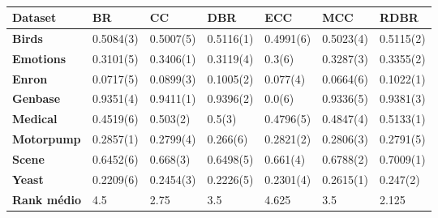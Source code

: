 \begin{table}[h]
\begin{tabular}{lllllll}
\hline
\textbf{Dataset}    & \textbf{BR} & \textbf{CC} & \textbf{DBR} & \textbf{ECC} & \textbf{MCC} & \textbf{RDBR} \\ \hline
\textbf{Birds}      & 0.5084(3)   & 0.5007(5)   & 0.5116(1)    & 0.4991(6)    & 0.5023(4)    & 0.5115(2)     \\
\textbf{Emotions}   & 0.3101(5)   & 0.3406(1)   & 0.3119(4)    & 0.3(6)       & 0.3287(3)    & 0.3355(2)     \\
\textbf{Enron}      & 0.0717(5)   & 0.0899(3)   & 0.1005(2)    & 0.077(4)     & 0.0664(6)    & 0.1022(1)     \\
\textbf{Genbase}    & 0.9351(4)   & 0.9411(1)   & 0.9396(2)    & 0.0(6)       & 0.9336(5)    & 0.9381(3)     \\
\textbf{Medical}    & 0.4519(6)   & 0.503(2)    & 0.5(3)       & 0.4796(5)    & 0.4847(4)    & 0.5133(1)     \\
\textbf{Motorpump}  & 0.2857(1)   & 0.2799(4)   & 0.266(6)     & 0.2821(2)    & 0.2806(3)    & 0.2791(5)     \\
\textbf{Scene}      & 0.6452(6)   & 0.668(3)    & 0.6498(5)    & 0.661(4)     & 0.6788(2)    & 0.7009(1)     \\
\textbf{Yeast}      & 0.2209(6)   & 0.2454(3)   & 0.2226(5)    & 0.2301(4)    & 0.2615(1)    & 0.247(2)      \\ \hline
\textbf{Rank médio} & 4.5         & 2.75        & 3.5          & 4.625        & 3.5          & 2.125         \\ \hline
\end{tabular}
\caption{}
\label{tab:SAknn}
\end{table}